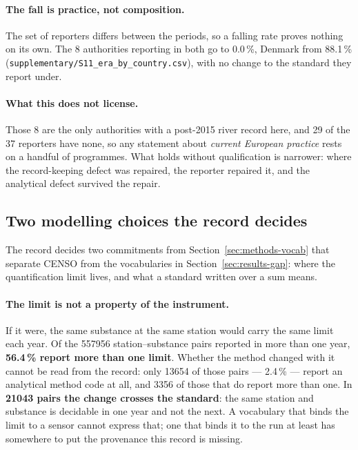 \paragraph{The fall is practice, not composition.} The set of reporters differs
between the periods, so a falling rate proves nothing on its own. The \num{8}
authorities reporting in both go to \num{0.0}\,\%, Denmark from \num{88.1}\,\%
(\texttt{supplementary/S11\_era\_by\_country.csv}), with no change to the
standard they report under.

\paragraph{What this does not license.} Those \num{8} are the only authorities
with a post-\num{2015} river record here, and \num{29} of the \num{37}
reporters have none, so any statement about \emph{current European practice}
rests on a handful of programmes. What holds without qualification is narrower:
where the record-keeping defect was repaired, the reporter repaired it, and the
analytical defect survived the repair.

\subsection{Two modelling choices the record decides}
\label{sec:results-modelling}
The record decides two commitments from Section~\ref{sec:methods-vocab} that
separate CENSO from the vocabularies in
Section~\ref{sec:results-gap}: where
the quantification limit lives, and what a standard written over a sum means.

\paragraph{The limit is not a property of the instrument.}
If it were, the same substance at the same station would carry the same limit
each year. Of the \num{557956} station--substance pairs reported in more than one
year, \textbf{\num{56.4}\,\% report more than one limit}. Whether the method
changed with it cannot be read from the record: only \num{13654} of those pairs
--- \num{2.4}\,\% --- report an analytical method code at all, and \num{3356}
of those that do report more than one. In \textbf{\num{21043} pairs the change
crosses the standard}: the same station and substance is decidable in one year
and not the next. A vocabulary that binds the limit to a sensor cannot express
that; one that binds it to the run at least has somewhere to put the provenance
this record is missing.

